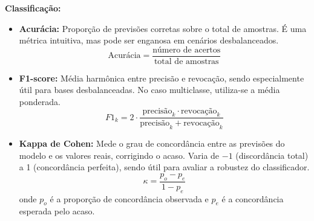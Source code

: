 \textbf{Classificação:}
\begin{itemize}
    \item \textbf{Acurácia:} Proporção de previsões corretas sobre o total de amostras. É uma métrica intuitiva, mas pode ser enganosa em cenários desbalanceados.
    \begin{equation*}
        \text{Acurácia} = \frac{\text{número de acertos}}{\text{total de amostras}}
    \end{equation*}
    \item \textbf{F1-score:} Média harmônica entre precisão e revocação, sendo especialmente útil para bases desbalanceadas. No caso multiclasse, utiliza-se a média ponderada.
    \begin{equation*}
        F1_k = 2 \cdot \frac{\text{precisão}_k \cdot \text{revocação}_k}{\text{precisão}_k + \text{revocação}_k}
    \end{equation*}
    \item \textbf{Kappa de Cohen:} Mede o grau de concordância entre as previsões do modelo e os valores reais, corrigindo o acaso. Varia de $-1$ (discordância total) a 1 (concordância perfeita), sendo útil para avaliar a robustez do classificador.
    \begin{equation*}
        \kappa = \frac{p_o - p_e}{1 - p_e}
    \end{equation*}
    onde $p_o$ é a proporção de concordância observada e $p_e$ é a concordância esperada pelo acaso.
\end{itemize}

